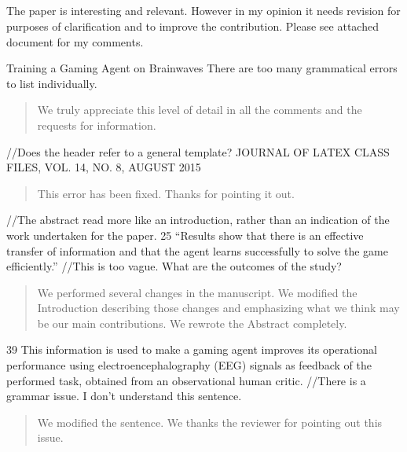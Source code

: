 \documentclass[journal,onecolumn,12pt]{IEEEtran}
\begin{document}
\subsection*{}
The paper is interesting and relevant. However in my opinion it needs revision for purposes of clarification and to improve the contribution.
Please see attached document for my comments.

Training a Gaming Agent on Brainwaves
There are too many grammatical errors to list individually.

\vspace{2em}
\begin{quotation}
{\color{blue}
We truly appreciate this level of detail in all the comments and the requests for information. 
}
\end{quotation}
\vspace{2em}

//Does the header refer to a general template?
JOURNAL OF LATEX CLASS FILES, VOL. 14, NO. 8, AUGUST 2015

\vspace{2em}
\begin{quotation}
{\color{blue}
This error has been fixed.  Thanks for pointing it out.
}
\end{quotation}
\vspace{2em}

//The abstract read more like an introduction, rather than an indication of the work undertaken for the paper.
25 “Results show that there is an effective transfer of information and that
the agent learns successfully to solve the game efficiently.”
//This is too vague. What are the outcomes of the study?

\vspace{2em}
\begin{quotation}
{\color{blue}
We performed several changes in the manuscript.  We modified the Introduction describing those changes and emphasizing what we think may be our main contributions.  We rewrote the Abstract completely.
}
\end{quotation}
\vspace{2em}

39 This information is used to make a gaming agent improves its operational performance using electroencephalography (EEG) signals as feedback of the performed task, obtained from an observational human critic.
//There is a grammar issue. I don’t understand this sentence.

\vspace{2em}
\begin{quotation}
{\color{blue}
We modified the sentence.  We thanks the reviewer for pointing out this issue.
}
\end{quotation}
\vspace{2em}
\end{document}
